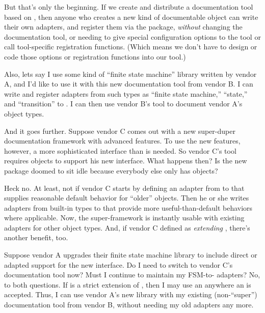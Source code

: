 \begin{verbatim%
}
\begin{verbatim%
}
But that's only the beginning.  If we create and distribute a documentation
tool based on , then anyone who creates a new kind of
documentable object can write their own adapters, and register them via the
 package, \emph{without} changing the documentation tool, or
needing to give special configuration options to the tool or call tool-specific
registration functions.  (Which means we don't have to design or code those
options or registration functions into our tool.)

Also, lets say I use some kind of ``finite state machine'' library written by
vendor A, and I'd like to use it with this new documentation tool from vendor
B.  I can write and register adapters from such types as ``finite state
machine,'' ``state,'' and ``transition'' to .  I can then
use vendor B's tool to document vendor A's object types.

And it goes further.  Suppose vendor C comes out with a new super-duper
documentation framework with advanced features.  To use the new features,
however, a more sophisticated interface than  is needed.
So vendor C's tool requires objects to support his new
 interface.  What happens then?  Is the new package
doomed to sit idle because everybody else only has 
objects?

Heck no.  At least, not if vendor C starts by defining an adapter from
 to  that supplies reasonable
default behavior for ``older'' objects.  Then he or she writes adapters from
built-in types to  that provide more
useful-than-default behaviors where applicable.  Now, the super-framework is
instantly usable with existing adapters for other object types.  And, if vendor
C defined  as \emph{extending} ,
there's another benefit, too.



Suppose vendor A upgrades their finite state machine library to include direct
or adapted support for the new  interface.  Do I need
to switch to vendor C's documentation tool now?  Must I continue to maintain my
FSM-to- adapters?  No, to both questions.  If
 is a strict extension of , then
I may use an  anywhere an  is
accepted.  Thus, I can use vendor A's new library with my existing
(non-``super'') documentation tool from vendor B, without needing my old
adapters any more.


\end{verbatim%
}
\end{verbatim%
}
